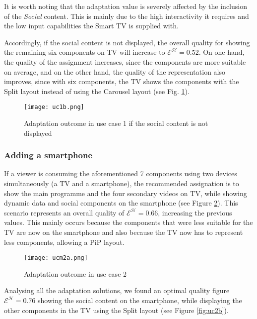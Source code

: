 It is worth noting that the adaptation value is severely affected by the inclusion of the \emph{Social} content. This is mainly due to the high interactivity it requires and the low input capabilities the Smart TV is supplied with. 

Accordingly, if the social content is not displayed, the overall quality for showing the remaining six components on TV will increase to $\mathcal{E}^\mathcal{H} =0.52$. 
On one hand, the quality of the assignment increases, since the components are more suitable on average, and on the other hand, the quality of the representation also improves, since with six components, the TV shows the components with the Split layout instead of using the Carousel layout (see Fig. \ref{fig:uc1b}).

\begin{figure}
	\begin{center}
		\texttt{[image: uc1b.png]}
		\caption{Adaptation outcome in use case 1 if the social content is not displayed}
		\label{fig:uc1b}
	\end{center}
\end{figure} 

\subsubsection{Adding a smartphone}

If a viewer is consuming the aforementioned 7 components using two devices simultaneously (a TV and a smartphone), the recommended assignation is to show the main programme and the four secondary videos on TV, while showing dynamic data and social components on the smartphone (see Figure \ref{fig:uc2a}). This scenario represents an overall quality of $\mathcal{E}^\mathcal{H}=0.66$, increasing the previous values. This mainly occurs because the components that were less suitable for the TV are now on the smartphone and also because the TV now has to represent less components, allowing a PiP layout. 

\begin{figure}
	\begin{center}
		\texttt{[image: ucm2a.png]}
		\caption{Adaptation outcome in use case 2}
		\label{fig:uc2a}
	\end{center}
\end{figure} 

Analysing all the adaptation solutions, we found an optimal quality figure $\mathcal{E}^\mathcal{H} = 0.76$ showing the social content on the smartphone, while displaying the other components in the TV using the Split layout (see Figure \ref{fig:uc2b}).

